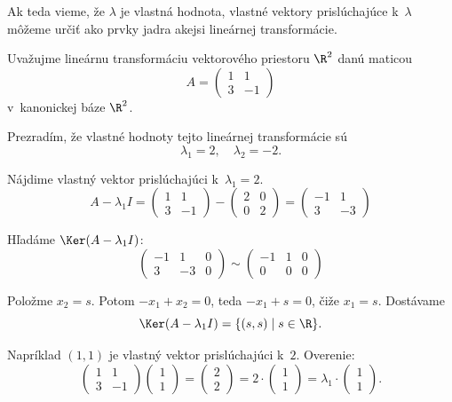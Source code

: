 Ak teda vieme, že $\lambda$ je vlastná hodnota, vlastné vektory prislúchajúce k~$\lambda$ môžeme určiť ako prvky jadra akejsi lineárnej transformácie.

\begin{priklad}
Uvažujme lineárnu transformáciu vektorového priestoru $\R^2$ danú maticou
\[
  A = \begin{pmatrix} 1 & 1 \\ 3 & -1 \end{pmatrix}
\]
v~kanonickej báze $\R^2$.

Prezradím, že vlastné hodnoty tejto lineárnej transformácie sú
\[
  \lambda_1 = 2, \quad \lambda_2 = -2.
\]

Nájdime vlastný vektor prislúchajúci k~$\lambda_1 = 2$.
\[
  A - \lambda_1 I
  = \begin{pmatrix} 1 & 1 \\ 3 & -1 \end{pmatrix}
  - \begin{pmatrix} 2 & 0 \\ 0 & 2 \end{pmatrix}
  = \begin{pmatrix} -1 & 1 \\ 3 & -3 \end{pmatrix}
\]

Hľadáme $\Ker(A - \lambda_1 I)$:
\[
  \left(\begin{array}{cc|c}
    -1 & 1 & 0 \\
     3 & -3 & 0
  \end{array}\right)
  \sim
  \left(\begin{array}{cc|c}
    -1 & 1 & 0 \\
     0 & 0 & 0
  \end{array}\right)
\]

Položme $x_2 = s$. Potom $-x_1 + x_2 = 0$, teda $-x_1 + s = 0$, čiže $x_1 = s$. Dostávame
\[
  \Ker(A - \lambda_1 I)
  = \{(s, s) \mid s \in \R\}.
\]

Napríklad $(1,1)$ je vlastný vektor prislúchajúci k~$2$. Overenie:
\[
  \begin{pmatrix} 1 & 1 \\ 3 & -1 \end{pmatrix}
  \begin{pmatrix} 1 \\ 1 \end{pmatrix}
  = \begin{pmatrix} 2 \\ 2 \end{pmatrix}
  = 2 \cdot \begin{pmatrix} 1 \\ 1 \end{pmatrix}
  = \lambda_1 \cdot \begin{pmatrix} 1 \\ 1 \end{pmatrix}.
\]


\end{priklad}

